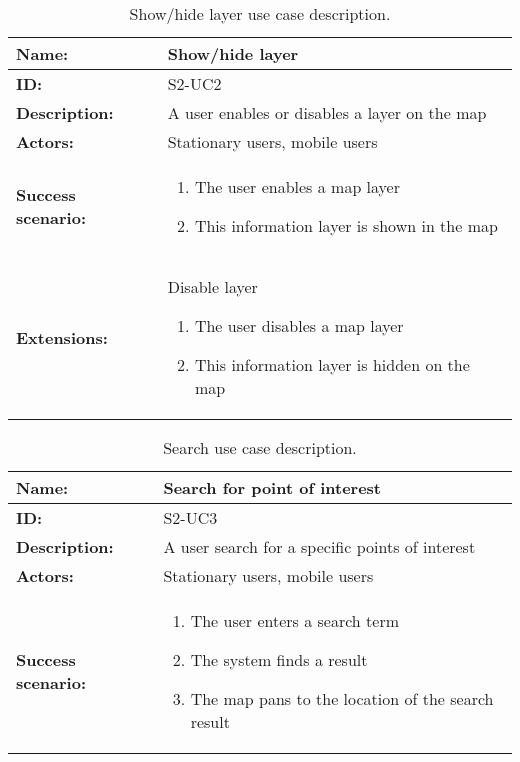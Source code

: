 \begin{table}[h!]
    \centering
    \begin{tabularx}{\textwidth}{|l|X|}
        \hline
        \textbf{Name:}  & Show/hide layer \\ \hline
        \textbf{ID:}    & S2-UC2 \\ \hline
        \textbf{Description:} & A user enables or disables a layer on the map \\ \hline
        \textbf{Actors:} & Stationary users, mobile users \\ \hline
        \textbf{Success scenario:} & 
        \begin{enumerate}
            \item The user enables a map layer
            \item This information layer is shown in the map
        \end{enumerate}
        \\ \hline
        \textbf{Extensions:} & Disable layer \newline
        \begin{enumerate}
            \item The user disables a map layer
            \item This information layer is hidden on the map
        \end{enumerate}
        \\ \hline
    \end{tabularx}
    \caption{Show/hide layer use case description.}
    \label{tab:s2-uc2}
\end{table}

\begin{table}[h!]
    \centering
    \begin{tabularx}{\textwidth}{|l|X|}
        \hline
        \textbf{Name:}  & Search for point of interest \\ \hline
        \textbf{ID:}    & S2-UC3 \\ \hline
        \textbf{Description:} & A user search for a specific points of interest \\ \hline
        \textbf{Actors:} & Stationary users, mobile users \\ \hline
        \textbf{Success scenario:} & 
        \begin{enumerate}
            \item The user enters a search term
            \item The system finds a result
            \item The map pans to the location of the search result
        \end{enumerate}
        \\ \hline
    \end{tabularx}
    \caption{Search use case description.}
    \label{tab:s2-uc3}
\end{table}

